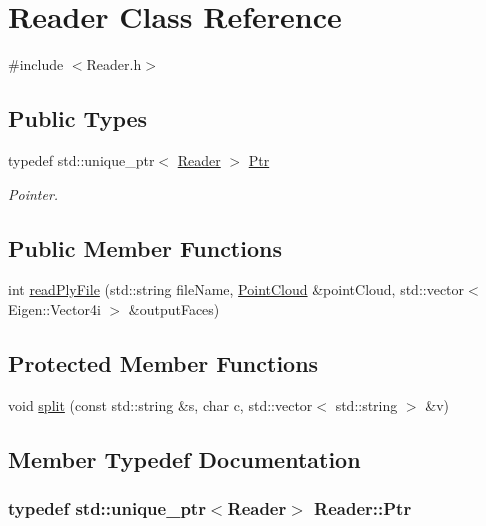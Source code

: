 \hypertarget{class_reader}{\section{Reader Class Reference}
\label{class_reader}
}


{\ttfamily \#include $<$Reader.\-h$>$}

\subsection*{Public Types}
\begin{DoxyCompactItemize}
\item 
typedef std\-::unique\-\_\-ptr$<$ \hyperlink{class_reader}{Reader} $>$ \hyperlink{class_reader_aca9a3e7e4e5d47385235587c6f86c592}{Ptr}
\begin{DoxyCompactList}\small\item\em Pointer. \end{DoxyCompactList}\end{DoxyCompactItemize}
\subsection*{Public Member Functions}
\begin{DoxyCompactItemize}
\item 
int \hyperlink{class_reader_af6c9fb04a6f48959aaf11aa68a9c2a52}{read\-Ply\-File} (std\-::string file\-Name, \hyperlink{class_point_cloud}{Point\-Cloud} \&point\-Cloud, std\-::vector$<$ Eigen\-::\-Vector4i $>$ \&output\-Faces)
\end{DoxyCompactItemize}
\subsection*{Protected Member Functions}
\begin{DoxyCompactItemize}
\item 
void \hyperlink{class_reader_a6f5ad886644e606d7dda4e3ae6a37cdf}{split} (const std\-::string \&s, char c, std\-::vector$<$ std\-::string $>$ \&v)
\end{DoxyCompactItemize}


\subsection{Member Typedef Documentation}
\hypertarget{class_reader_aca9a3e7e4e5d47385235587c6f86c592}{
\subsubsection[{Ptr}]{\setlength{\rightskip}{0pt plus 5cm}typedef std\-::unique\-\_\-ptr$<${\bf Reader}$>$ {\bf Reader\-::\-Ptr}}}\label{class_reader_aca9a3e7e4e5d47385235587c6f86c592}



